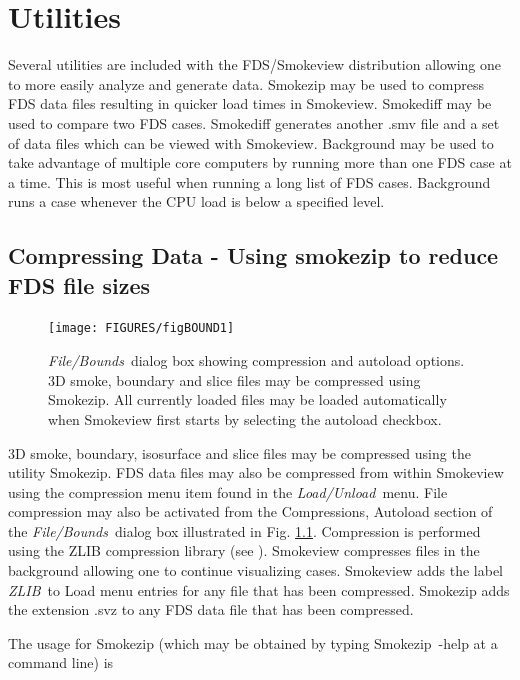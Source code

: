 \documentclass[11pt,twoside]{book}
\begin{document}
\chapter{Utilities}
Several utilities are included with the FDS/Smokeview distribution allowing one
to more easily analyze and generate data.  Smokezip may be used to compress
FDS data files resulting in quicker load times in Smokeview.  Smokediff may be used
to compare two FDS cases.  Smokediff generates another .smv file and a set of data files
which can be viewed with Smokeview.  Background may be used to take advantage of multiple
core computers by running more than one FDS case at a time.  This is most useful when running
a long list of FDS cases. Background runs a case whenever the CPU load is below a specified level.


\section{Compressing Data - Using smokezip to reduce FDS file sizes}
\label{ch:smokezip}

\begin{figure}[\figoptions]
\centerline{\texttt{[image: FIGURES/figBOUND1]} }
\caption[{\em Compress Files}\ and {\em Autoload}\ dialog box.] {{\em File/Bounds}\ dialog
box showing compression and autoload options.  3D smoke,  boundary and slice
files may be compressed using Smokezip.  All currently loaded
files may be loaded automatically when Smokeview first starts by
selecting the autoload checkbox.} \label{figBOUNDScompress}
\end{figure}

3D smoke, boundary, isosurface and slice files may be compressed
using the utility Smokezip.  FDS data files may also be compressed
from within Smokeview using the compression menu item found in the
{\em Load/Unload}\ menu.  File compression may also be activated
from the Compressions, Autoload section of the {\em File/Bounds}\
dialog box illustrated in Fig. \ref{figBOUNDScompress}.
Compression is performed using the ZLIB compression library (see
\hhref{http://www.zlib.org}). Smokeview compresses files in the
background allowing one to continue visualizing cases.  Smokeview
adds the label {\em ZLIB}\ to Load menu entries for any file that
has been compressed. Smokezip adds the extension .svz to any FDS
data file that has been compressed.

The usage for Smokezip (which may be obtained by typing Smokezip~-help at a command line) is
\end{document}
